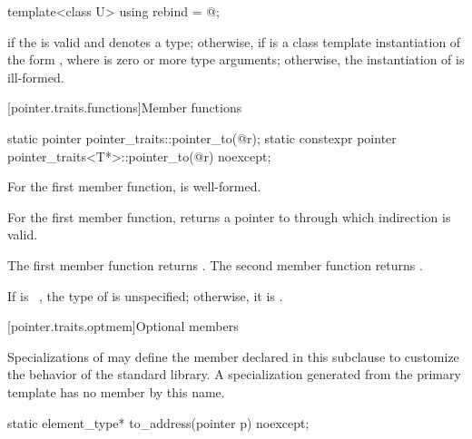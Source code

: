 %
\begin{itemdecl}
template<class U> using rebind = @\seebelow@;
\end{itemdecl}

\begin{itemdescr}
\pnum
\templalias {} if
the   is valid and denotes a
type; otherwise,
 if
 is a class template instantiation of the form ,
where  is zero or more type arguments; otherwise, the instantiation of
 is ill-formed.
\end{itemdescr}

[pointer.traits.functions]{Member functions}

%
\begin{itemdecl}
static pointer pointer_traits::pointer_to(@\seebelow@ r);
static constexpr pointer pointer_traits<T*>::pointer_to(@\seebelow@ r) noexcept;
\end{itemdecl}

\begin{itemdescr}
\pnum
\mandates
For the first member function,
 is well-formed.

\pnum
\expects
For the first member function,
 returns a pointer to 
through which indirection is valid.

\pnum
\returns
The first member function returns .
The second member function returns .

\pnum
\remarks
If  is \cv{}~, the type of
 is unspecified; otherwise, it is .
\end{itemdescr}

[pointer.traits.optmem]{Optional members}

\pnum
Specializations of  may define the member declared
in this subclause to customize the behavior of the standard library.
A specialization generated from the  primary template
has no member by this name.

%
\begin{itemdecl}
static element_type* to_address(pointer p) noexcept;
\end{itemdecl}

